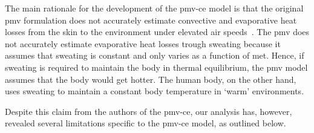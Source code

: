 The main rationale for the development of the \ac{pmv-ce} model is that the original \ac{pmv} formulation does not accurately estimate convective and evaporative heat losses from the skin to the environment under elevated air speeds~\cite{huang_applicability_2014}.
The \ac{pmv} does not accurately estimate evaporative heat losses trough sweating because it assumes that sweating is constant and only varies as a function of \ac{met}.
Hence, if sweating is required to maintain the body in thermal equilibrium, the \ac{pmv} model assumes that the body would get hotter.
The human body, on the other hand, uses sweating to maintain a constant body temperature in `warm' environments.

Despite this claim from the authors of the \ac{pmv-ce}, our analysis has, however, revealed several limitations specific to the \ac{pmv-ce} model, as outlined below.

